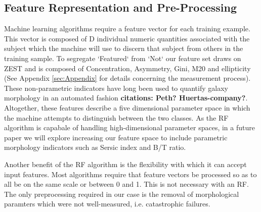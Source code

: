 \documentclass[twocolumn]{aastex6}
\begin{document}
\subsection{Feature Representation and Pre-Processing}
Machine learning algorithms require a feature vector for each training example. 
This vector is composed of D individual numeric quantities associated with the 
subject which the machine will use to discern that subject from others in the 
training sample. To segregate `Featured` from `Not` our feature set draws 
on ZEST \citep{Scarlata2007} and  is composed of Concentration, Asymmetry, Gini, 
M20 and ellipticity (See Appendix \ref{sec:Appendix} for details concerning the 
measurement process). These non-parametric indicators have long been used to 
quantify galaxy morphology in an automated fashion \textbf{citations: Peth? Huertas-company?}. 
Altogether, these features describe a five dimensional parameter space in 
which the machine attempts to distinguish between the two classes. 
As the RF algorithm is capabale of handling high-dimensional parameter spaces, in
a future paper we will explore increasing our feature space to include parametric
morphology indicators such as Sersic index and B/T ratio. 

Another benefit of the RF algorithm is the flexibility with which it can accept input 
features. Most algorithms require that feature vectors be processed so as to all 
be on the same scale or between 0 and 1. This is not necessary with an RF. The only
preprocessing required in our case is the removal of morphological paramters which
were not well-measured, i.e. catastrophic failures. 


\end{document}

